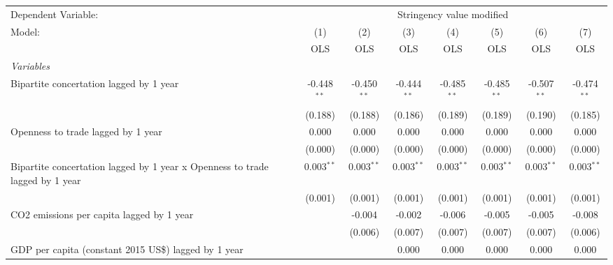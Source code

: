 
\begingroup
\centering
\begin{tabular}{lccccccc}
   \toprule
   Dependent Variable: & \multicolumn{7}{c}{Stringency value modified}\\
   Model:                                                                       & (1)           & (2)           & (3)           & (4)           & (5)           & (6)           & (7)\\  
                                                                                &  OLS          & OLS           & OLS           & OLS           & OLS           & OLS           & OLS\\  
   \midrule
   \emph{Variables}\\
   Bipartite concertation lagged by 1 year                                      & -0.448$^{**}$ & -0.450$^{**}$ & -0.444$^{**}$ & -0.485$^{**}$ & -0.485$^{**}$ & -0.507$^{**}$ & -0.474$^{**}$\\   
                                                                                & (0.188)       & (0.188)       & (0.186)       & (0.189)       & (0.189)       & (0.190)       & (0.185)\\   
   Openness to trade lagged by 1 year                                           & 0.000         & 0.000         & 0.000         & 0.000         & 0.000         & 0.000         & 0.000\\   
                                                                                & (0.000)       & (0.000)       & (0.000)       & (0.000)       & (0.000)       & (0.000)       & (0.000)\\   
   Bipartite concertation lagged by 1 year x Openness to trade lagged by 1 year & 0.003$^{**}$  & 0.003$^{**}$  & 0.003$^{**}$  & 0.003$^{**}$  & 0.003$^{**}$  & 0.003$^{**}$  & 0.003$^{**}$\\   
                                                                                & (0.001)       & (0.001)       & (0.001)       & (0.001)       & (0.001)       & (0.001)       & (0.001)\\   
   CO2 emissions per capita lagged by 1 year                                    &               & -0.004        & -0.002        & -0.006        & -0.005        & -0.005        & -0.008\\   
                                                                                &               & (0.006)       & (0.007)       & (0.007)       & (0.007)       & (0.007)       & (0.006)\\   
   GDP per capita (constant 2015 US\$) lagged by 1 year                         &               &               & 0.000         & 0.000         & 0.000         & 0.000         & 0.000\\   

\end{tabular}
